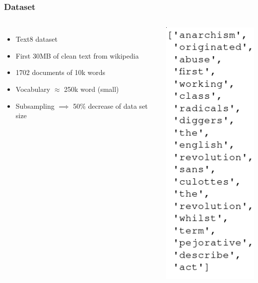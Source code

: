\begin{frame}
\frametitle{Dataset} 
\begin{columns}
    \begin{itemize}
\item Text8 dataset
\item First 30MB of clean text from wikipedia 
\item 1702 documents of 10k words  
\item Vocabulary $\approx$ 250k word (small) 
\item Subsampling $\implies$ 50\% decrease of data set size
\end{itemize}
        \includegraphics[scale=0.35]{images/text8snippet}
  \end{columns}
\end{frame}

